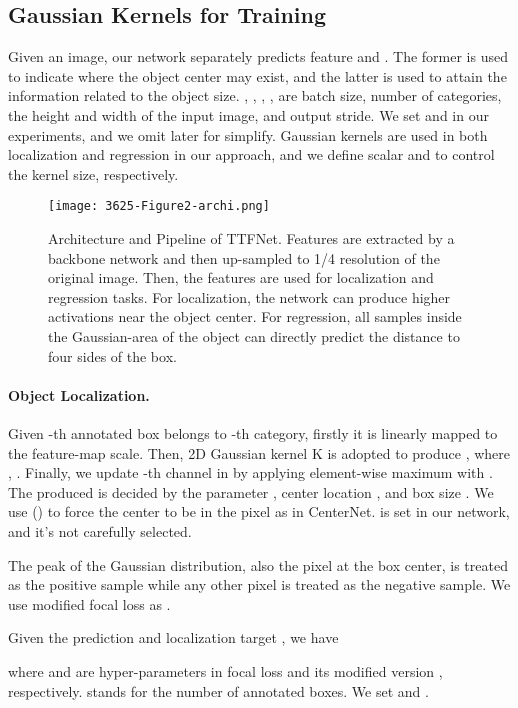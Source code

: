 \documentclass[letterpaper]{article} \usepackage{aaai20}  \usepackage{times}  \usepackage{helvet} \usepackage{courier}  \usepackage[hyphens]{url}  \usepackage{graphicx} \urlstyle{rm} \def\UrlFont{\rm}  \usepackage{graphicx}  \frenchspacing  \setlength{\pdfpagewidth}{8.5in}  \setlength{\pdfpageheight}{11in}  \usepackage{subcaption}
\begin{document}
\subsection{Gaussian Kernels for Training}
Given an image, our network separately predicts feature  and . The former is used to indicate where the object center may exist, and the latter is used to attain the information related to the object size. , , , ,  are batch size, number of categories, the height and width of the input image, and output stride. We set  and  in our experiments, and we omit  later for simplify. Gaussian kernels are used in both localization and regression in our approach, and we define scalar  and  to control the kernel size, respectively.


\begin{figure}[!t]
  \centering
  \texttt{[image: 3625-Figure2-archi.png]}
\caption{Architecture and Pipeline of TTFNet. Features are extracted by a backbone network and then up-sampled to 1/4 resolution of the original image. Then, the features are used for localization and regression tasks. For localization, the network can produce higher activations near the object center. For regression, all samples inside the Gaussian-area of the object can directly predict the distance to four sides of the box.}
  \label{archi}
\end{figure}


\paragraph{Object Localization.} Given -th annotated box belongs to -th category, firstly it is linearly mapped to the feature-map scale. Then, 2D Gaussian kernel K is adopted to produce , where , . Finally, we update -th channel in  by applying element-wise maximum with . The produced  is decided by the parameter , center location , and box size . We use () to force the center to be in the pixel as in CenterNet.  is set in our network, and it's not carefully selected.

The peak of the Gaussian distribution, also the pixel at the box center, is treated as the positive sample while any other pixel is treated as the negative sample. We use modified focal loss as  \cite{law2018cornernet,DBLP:journals/corr/abs-1904-07850}.

Given the prediction  and localization target , we have




\noindent where  and  are hyper-parameters in focal loss \cite{lin2017focal} and its modified version \cite{law2018cornernet,DBLP:journals/corr/abs-1904-07850}, respectively.  stands for the number of annotated boxes. We set  and .
\end{document}
